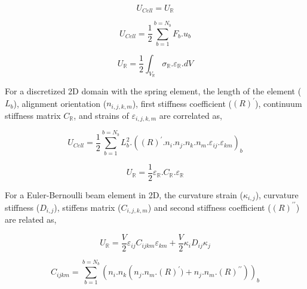 \begin{equation}
\label{eq:LEM_Mechanical_1}
 U_{Cell}=U_{\mathbb{R}}
\end{equation}

\begin{equation}
\label{eq:LEM_Mechanical_2}
 U_{Cell}=\frac{1}{2}\sum_{b=1}^{b=N_b}F_b.u_b
\end{equation}

\begin{equation}
\label{eq:LEM_Mechanical_3}
 U_{\mathbb{R}}=\frac{1}{2}\int_{V_{\mathbb{R}}}{\sigma_{\mathbb{R}}.\varepsilon_{\mathbb{R}}.dV}
\end{equation}

For a discretized 2D domain with the spring element, the length of the element ($L_b$), alignment orientation ($n_{i,j,k,m}$), first stiffness coefficient ($(R)^\prime$), continuum stiffness matrix $C_{\mathbb{R}}$, and strains of $\varepsilon_{i,j,k,m}$ are correlated as,

\begin{equation}
\label{eq:LEM_Mechanical_4}
U_{Cell}=\frac{1}{2}\sum_{b=1}^{b=N_b}L_b^2.((R)^\prime.n_i.n_j.n_k.n_m.\varepsilon_{ij}.\varepsilon_{km})_b
\end{equation}

\begin{equation}
\label{eq:LEM_Mechanical_5}
U_{\mathbb{R}}=\frac{1}{2}\varepsilon_{\mathbb{R}}.C_{\mathbb{R}}.\varepsilon_{\mathbb{R}}
\end{equation}

For a Euler-Bernoulli beam element in 2D, the curvature strain ($\kappa_{i,j}$), curvature stiffness ($D_{i,j}$), stiffens matrix ($C_{i,j,k,m}$) and second stiffness coefficient ($(R)^{\prime\prime}$) are related as,

\begin{equation}
\label{eq:LEM_Mechanical_6}
U_{\mathbb{R}}=\frac{V}{2}\varepsilon_{ij}C_{ijkm}\varepsilon_{km}+\frac{V}{2}\kappa_{i}D_{ij}\kappa_j
\end{equation}

\begin{equation}
\label{eq:LEM_Mechanical_7}
C_{ijkm}=\sum_{b=1}^{b=N_b} ({n_i.n_k \left( n_j.n_m.(R)^\prime)+n_j.n_m.(R)^{\prime\prime} \right)})_b
\end{equation}


